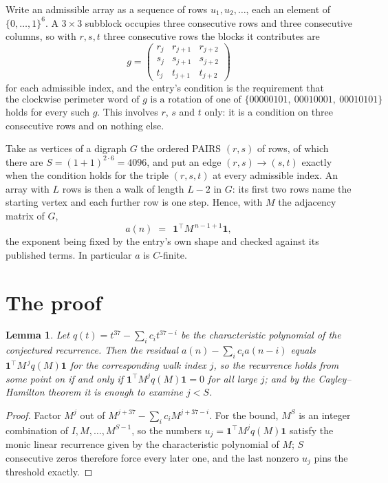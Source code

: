 \documentclass[11pt,a4paper]{article}
\theoremstyle{plain}
\newtheorem{lemma}[theorem]{Lemma}
\theoremstyle{definition}
\begin{document}
Write an admissible array as a sequence of rows $u_1,u_2,\dots$, each an element of
$\{0,\dots,1\}^{6}$. A $3\times3$ subblock occupies three consecutive rows and
three consecutive columns, so with $r,s,t$ three consecutive rows the blocks it
contributes are
\[
g=\begin{pmatrix}r_j&r_{j+1}&r_{j+2}\\ s_j&s_{j+1}&s_{j+2}\\ t_j&t_{j+1}&t_{j+2}\end{pmatrix}
\]
for each admissible index, and the entry's condition is the requirement that
\[
\text{the clockwise perimeter word of }g\text{ is a rotation of one of }\{00000101,\ 00010001,\ 00010101\}
\]
holds for every such $g$. This involves $r$, $s$ and $t$ only: it is a condition on
three consecutive rows and on nothing else.

Take as vertices of a digraph $G$ the ordered PAIRS $(r,s)$ of rows, of which there are
$S=(1+1)^{2\cdot6}=4096$, and put an edge $(r,s)\to(s,t)$ exactly when the condition
holds for the triple $(r,s,t)$ at every admissible index. An array with $L$ rows is then a
walk of length $L-2$ in $G$: its first two rows name the starting vertex and each further
row is one step. Hence, with $M$ the adjacency matrix of $G$,
\[
a(n)\;=\;\,\mathbf{1}^{\!\top}M^{\,n-1+1}\mathbf{1},
\]
the exponent being fixed by the entry's own shape and checked against its published terms.
In particular $a$ is $C$-finite.

\section{The proof}

\begin{lemma}\label{lem:crit}
Let $q(t)=t^{37}-\sum_i c_it^{37-i}$ be the characteristic polynomial of the
conjectured recurrence. Then the residual $a(n)-\sum_ic_ia(n-i)$ equals
$\mathbf{1}^{\!\top}M^{\,j}q(M)\mathbf{1}$ for the corresponding walk index
$j$, so the recurrence holds from some point on if and only if
$\mathbf{1}^{\!\top}M^{j}q(M)\mathbf{1}=0$ for all large $j$; and by the
Cayley--Hamilton theorem it is enough to examine $j<S$.
\end{lemma}

\begin{proof}
Factor $M^{j}$ out of $M^{j+37}-\sum_ic_iM^{j+37-i}$. For the bound, $M^{S}$
is an integer combination of $I,M,\dots,M^{S-1}$, so the numbers
$u_j=\mathbf{1}^{\!\top}M^{j}q(M)\mathbf{1}$ satisfy the monic linear recurrence given by
the characteristic polynomial of $M$; $S$ consecutive zeros therefore force every later one,
and the last nonzero $u_j$ pins the threshold exactly.
\end{proof}
\end{document}
